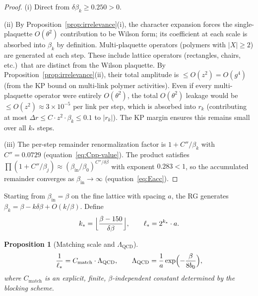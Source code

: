 \documentclass[11pt]{article}
\newtheorem{proposition}[theorem]{Proposition}
\theoremstyle{definition}
\newcommand{\Lam}{\Lambda_{\mathrm{QCD}}}
\begin{document}
\begin{proof}
(i) Direct from $\delta\beta_k\ge 0.250>0$.

(ii) By Proposition~\ref{prop:irrelevance}(i), the character
expansion forces the single-plaquette $O(\theta^2)$ contribution
to be Wilson form; its coefficient at each scale is absorbed
into $\beta_k$ by definition.  Multi-plaquette operators
(polymers with $|X|\ge 2$) are generated at each step.
These include lattice operators (rectangles, chairs, etc.)\
that are distinct from the Wilson plaquette.
By Proposition~\ref{prop:irrelevance}(ii), their total
amplitude is $\le O(z^2)=O(g^4)$ (from the KP bound on
multi-link polymer activities).  Even if every
multi-plaquette operator were entirely $O(\theta^2)$, the
total $O(\theta^2)$ leakage would be
$\le O(z^2)\approx 3\times 10^{-5}$ per link per step,
which is absorbed into $r_k$ (contributing at most
$\Delta r\le C\cdot z^2\cdot\beta_k\le 0.1$ to $|r_k|$).
The KP margin ensures this remains small over all $k_*$ steps.

(iii) The per-step remainder renormalization
factor is $1+C''/\beta_k$ with $C''=0.0729$
(equation~\eqref{eq:Cpp-value}).  The product satisfies
$\prod(1+C''/\beta_j)
\approx(\beta_{\mathrm{in}}/\beta_0)^{C''/\delta\beta}$
with exponent $0.283<1$, so the accumulated remainder
converges as $\beta_{\mathrm{in}}\to\infty$
(equation~\eqref{eq:Eacc}).
\end{proof}

Starting from $\beta_{\mathrm{in}}=\beta$ on the fine lattice with spacing $a$,
the RG generates $\beta_k=\beta-k\delta\beta+O(k/\beta)$.  Define
\begin{equation}
k_*=\Bigl\lfloor\frac{\beta-150}{\delta\beta}\Bigr\rfloor,
\qquad\ell_*=2^{k_*}\cdot a.
\end{equation}

\begin{proposition}[Matching scale and $\Lam$]\label{prop:matching}
\begin{equation}\label{eq:matching}
\frac{1}{\ell_*}=C_{\mathrm{match}}\cdot\Lam,
\qquad\Lam=\frac{1}{a}\exp\Bigl(-\frac{\beta}{8b_0}\Bigr),
\end{equation}
where $C_{\mathrm{match}}$ is an explicit, finite, $\beta$-independent
constant determined by the blocking scheme.
\end{proposition}
\end{document}

